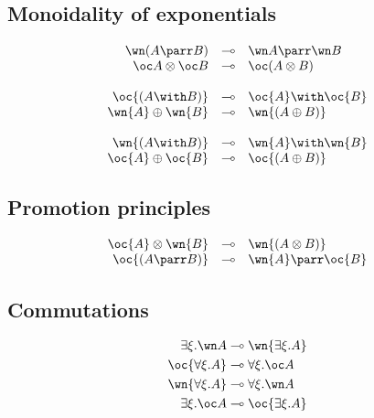 \subsection{Monoidality of exponentials}\label{monoidality-of-exponentials}

\begin{equation*}
\begin{array}{rcl}
  \wn(A\parr B) & \limp&  \wn A\parr\wn B \\
  \oc A\tens\oc B & \limp&  \oc(A\tens B) \\
\\
 \oc{(A \with B)} & \limp&  \oc{A} \with \oc{B} \\
 \wn{A} \plus \wn{B} & \limp&  \wn{(A \plus B)} \\
\\
 \wn{(A \with B)} & \limp&  \wn{A} \with \wn{B} \\
 \oc{A} \plus \oc{B} & \limp&  \oc{(A \plus B)}
\end{array}
\end{equation*}

\subsection{Promotion principles}\label{promotion-principles}

\begin{equation*}
\begin{array}{rcl}
 \oc{A} \tens \wn{B} & \limp&  \wn{(A \tens B)} \\
 \oc{(A \parr B)} & \limp&  \wn{A} \parr \oc{B}
\end{array}
\end{equation*}

\subsection{Commutations}\label{commutations}
\begin{align*}
\exists \xi . \wn A &\limp \wn{\exists \xi . A} \\
\oc{\forall \xi . A} &\limp \forall \xi . \oc A \\
\wn{\forall \xi . A} &\limp \forall \xi . \wn A \\
\exists \xi . \oc A &\limp \oc{\exists \xi . A}
\end{align*}


